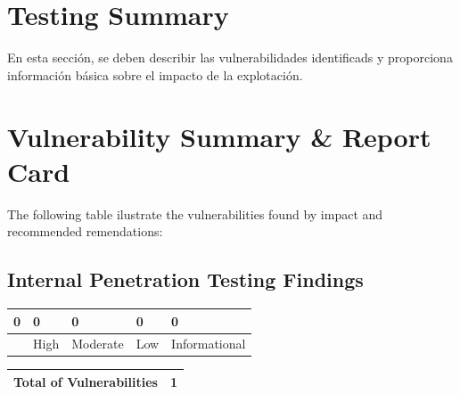 \documentclass[a4paper]{article} %
\begin{document}
    \section{Testing Summary}
    En esta sección, se deben describir las vulnerabilidades identificads y proporciona información básica sobre el impacto de la explotación.

    \clearpage
    \section{Vulnerability Summary \& Report Card}
    The following table ilustrate the vulnerabilities found by impact and recommended remendations:

    \subsection{Internal Penetration Testing Findings}

    \begin{table}[htbp]
        \begin{tabularx}{\textwidth}{|>{\centering\arraybackslash}X|>{\centering\arraybackslash}X|>{\centering\arraybackslash}X|>{\centering\arraybackslash}X|>{\centering\arraybackslash}X|}
            \hline
            \cellcolor{criticalColor}\textbf{0} &
            \cellcolor{highColor}\textbf{0} &
            \cellcolor{moderateColor}\textbf{0} &
            \cellcolor{lowColor}\textbf{0} &
            \cellcolor{informationalColor}\textbf{0} \\
            \hline
            {Critical} &
            {High} &
            {Moderate} &
            {Low} &
            {Informational} \\
            \hline
        \end{tabularx}
    \end{table}

    \begin{table}[htbp]
        \begin{tabularx}{\textwidth}{|X|>{\centering\arraybackslash}X|}
            \hline
            \cellcolor{lightBlueColor}\textbf{Total of Vulnerabilities} &
            {1} \\
            \hline
        \end{tabularx}
    \end{table}
\end{document}
